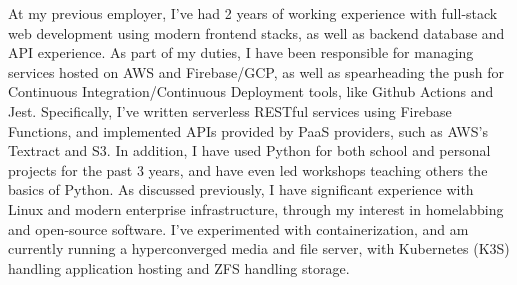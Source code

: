 \documentclass[11pt, letter]{awesome-cv}
\begin{document}
\begin{cvletter}
At my previous employer, I've had 2 years of working experience with full-stack web development
using modern frontend stacks, as well as backend database and API experience.
As part of my duties, I have been responsible for managing services hosted on AWS and Firebase/GCP,
as well as spearheading the push for Continuous Integration/Continuous Deployment tools,
like Github Actions and Jest.
Specifically, I've written serverless RESTful services using Firebase Functions, 
and implemented APIs provided by PaaS providers, such as AWS's Textract and S3.
In addition, I have used Python for both school and personal projects for the past 3 years,
and have even led workshops teaching others the basics of Python.
As discussed previously, I have significant experience with Linux and modern enterprise infrastructure,
through my interest in homelabbing and open-source software.
I've experimented with containerization,
and am currently running a hyperconverged media and file server,
with Kubernetes (K3S) handling application hosting and ZFS handling storage.


\end{cvletter}
\end{document}
